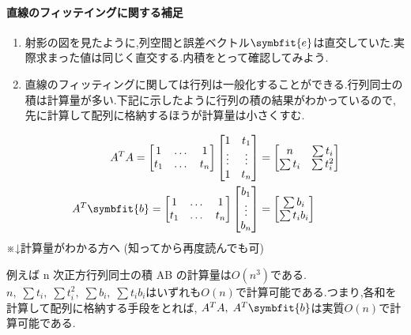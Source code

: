 \paragraph{直線のフィッテイングに関する補足}
\begin{enumerate}
    \item 射影の図を見たように,列空間と誤差ベクトル$\symbfit{e}$は直交していた.実際求まった値は同じく直交する.内積をとって確認してみよう.
    \item 直線のフィッティングに関しては行列は一般化することができる.行列同士の積は計算量が多い.下記に示したように行列の積の結果がわかっているので,先に計算して配列に格納するほうが計算量は小さくすむ.
\end{enumerate}
\begin{align*}
    A^TA=
    \begin{bmatrix}
        1 & \dots & 1 \\ t_1 & \dots & t_n
    \end{bmatrix}
    \begin{bmatrix}
        1 & t_1 \\ \vdots & \vdots \\ 1 & t_n
    \end{bmatrix}
    &=
    \begin{bmatrix}
        n & \sum t_i \\ \sum t_i & \sum t_i^2
    \end{bmatrix} \\
    A^T\symbfit{b} =
    \begin{bmatrix}
        1 & \dots & 1 \\ t_1 & \dots & t_n
    \end{bmatrix}
    \begin{bmatrix}
        b_1 \\ \vdots \\ b_n
    \end{bmatrix} 
    &=
    \begin{bmatrix}
        \sum b_i \\ \sum t_i b_i
    \end{bmatrix}
\end{align*}
※↓計算量がわかる方へ (知ってから再度読んでも可)
\begin{framed}
    例えば n 次正方行列同士の積 AB の計算量は$O(n^3)$である.\\
    $n,\;\sum t_i,\;\sum t_i^2,\; \sum b_i,\;\sum t_ib_i$はいずれも$O(n)$で計算可能である.つまり,各和を計算して配列に格納する手段をとれば,
    $A^TA,\;A^T\symbfit{b}$は実質$O(n)$で計算可能である.
\end{framed}
